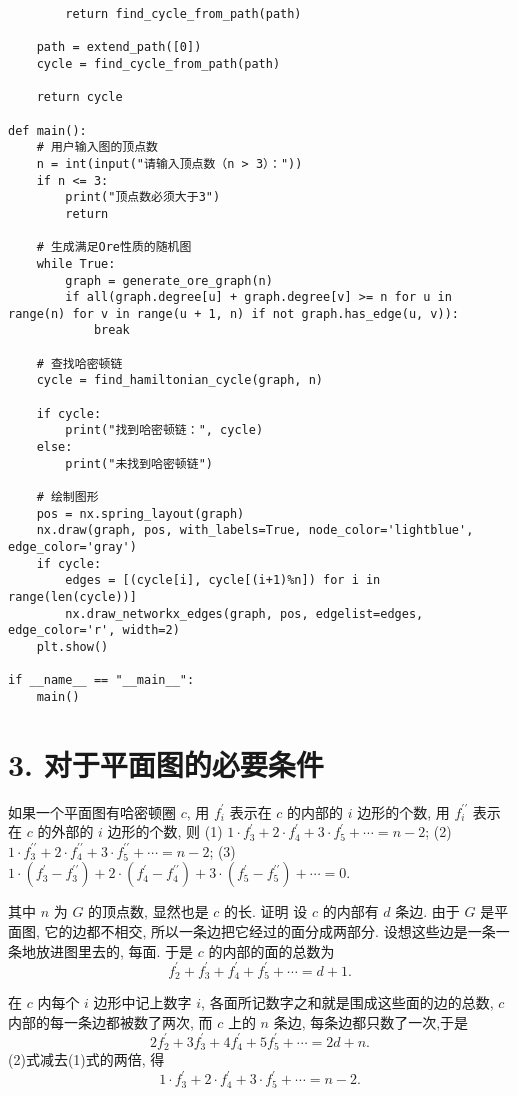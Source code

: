 \documentclass{article}
\begin{document}
\begin{lstlisting}
        return find_cycle_from_path(path)
    
    path = extend_path([0])
    cycle = find_cycle_from_path(path)
    
    return cycle

def main():
    # 用户输入图的顶点数
    n = int(input("请输入顶点数（n > 3）："))
    if n <= 3:
        print("顶点数必须大于3")
        return
    
    # 生成满足Ore性质的随机图
    while True:
        graph = generate_ore_graph(n)
        if all(graph.degree[u] + graph.degree[v] >= n for u in range(n) for v in range(u + 1, n) if not graph.has_edge(u, v)):
            break
    
    # 查找哈密顿链
    cycle = find_hamiltonian_cycle(graph, n)
    
    if cycle:
        print("找到哈密顿链：", cycle)
    else:
        print("未找到哈密顿链")
    
    # 绘制图形
    pos = nx.spring_layout(graph)
    nx.draw(graph, pos, with_labels=True, node_color='lightblue', edge_color='gray')
    if cycle:
        edges = [(cycle[i], cycle[(i+1)%n]) for i in range(len(cycle))]
        nx.draw_networkx_edges(graph, pos, edgelist=edges, edge_color='r', width=2)
    plt.show()

if __name__ == "__main__":
    main()
\end{lstlisting}
\section*{3. 对于平面图的必要条件}
如果一个平面图有哈密顿圈 $c$, 用 $f_i^{\prime}$ 表示在 $c$ 的内部的 $i$ 边形的个数, 用 $f_i^{\prime \prime}$ 表示在 $c$ 的外部的 $i$ 边形的个数, 则
(1) $1 \cdot f_3^{\prime}+2 \cdot f_4^{\prime}+3 \cdot f_5^{\prime}+\cdots=n-2$;
(2) $1 \cdot f_3^{\prime \prime}+2 \cdot f_4^{\prime \prime}+3 \cdot f_5^{\prime \prime}+\cdots=n-2$;
(3) $1 \cdot\left(f_3^{\prime}-f_3^{\prime \prime}\right)+2 \cdot\left(f_4^{\prime}-f_4^{\prime \prime}\right)+3 \cdot\left(f_5^{\prime}-f_5^{\prime \prime}\right)+\cdots=0$.

其中 $n$ 为 $G$ 的顶点数, 显然也是 $c$ 的长.
证明 设 $c$ 的内部有 $d$ 条边. 由于 $G$ 是平面图, 它的边都不相交, 所以一条边把它经过的面分成两部分. 设想这些边是一条一条地放进图里去的, 每面. 于是 $c$ 的内部的面的总数为
$$
f_2^{\prime}+f_3^{\prime}+f_4^{\prime}+f_5^{\prime}+\cdots=d+1 .
$$

在 $c$ 内每个 $i$ 边形中记上数字 $i$, 各面所记数字之和就是围成这些面的边的总数, $c$ 内部的每一条边都被数了两次, 而 $c$ 上的 $n$ 条边, 每条边都只数了一次,于是
$$
2 f_2^{\prime}+3 f_3^{\prime}+4 f_4^{\prime}+5 f_5^{\prime}+\cdots=2 d+n .
$$
(2)式减去(1)式的两倍, 得
$$
1 \cdot f_3^{\prime}+2 \cdot f_4^{\prime}+3 \cdot f_5^{\prime}+\cdots=n-2 .
$$
\end{document}
